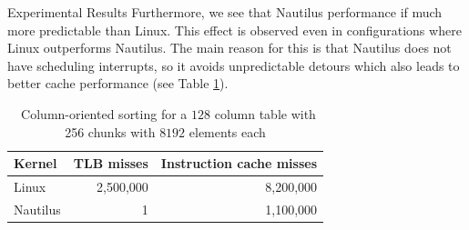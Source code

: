 \begin{block}{Experimental Results}
  Furthermore, we see that Nautilus performance if much more predictable than Linux. This effect is observed even in configurations where Linux outperforms Nautilus. The main reason for this is that Nautilus does not have scheduling interrupts, so it avoids unpredictable detours which also leads to better cache performance (see Table \ref{table:cache_miss-col}).

    \begin{table}
      \bgroup
      \def\arraystretch{1.3}%
      \setlength\tabcolsep{1cm}
      \begin{tabular}{l || r | r }
        \textbf{Kernel}    & TLB misses  & Instruction cache misses \\
        \hline\hline
        Linux              & 2,500,000 & 8,200,000 \\
        Nautilus           &         1 & 1,100,000 \\

      \end{tabular}
\egroup
      \caption{~Column-oriented sorting for a $128$ column table with 256 chunks with $8192$ elements each}
      \label{table:cache_miss-col}
    \end{table}
  

\end{block}

